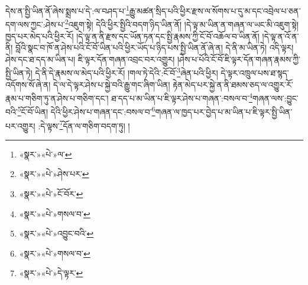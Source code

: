 དེས་ན་སྤྱི་ཡིན་ནོ་ཞེས་སྨྲས་པ་དེ་:ལ་བཤད་པ་\footnote{«སྣར་»«པེ་»ལ་}རྒྱུ་མཚན་སྲིད་པའི་ཕྱིར་རྫས་ལ་སོགས་པ་དུ་མ་དང་འབྲེལ་པ་ཅན་དག་ལས་ཀྱང་:ཤེས་པ་\footnote{«སྣར་»«པེ་»ཤེས་པར་}འཇུག་སྟེ། དེའི་ཕྱིར་སྤྱིའི་བདག་ཉིད་ཡིན་ནོ། །དེ་ལྟ་མ་ཡིན་ན་གཞན་ལ་ཡང་མི་འཇུག་སྟེ། ཁྱད་པར་མེད་པའི་ཕྱིར་རོ། །དེ་ལྟ་ན་ནི་རྫས་དང་ཡོན་ཏན་དང་སྤྱི་རྣམས་ཀྱི་ངོ་བོ་འཆོལ་བ་ཡིན་ནོ། །དེ་ལྟ་ན་འོ་ན་ནི། བློའི་སྣང་བ་ཁོ་ན་ཤེས་པའི་ངོ་བོ་ཡིན་པའི་ཕྱིར་ཡོད་པ་ཉིད་པས་སྤྱི་ཡིན་ནོ་ཞེ་ན། དེ་ནི་མ་ཡིན་ཏེ། འདི་ལྟར། ཤེས་དང་ཐ་དད་མ་ཡིན་པ། ཇི་ལྟར་དོན་གཞན་འབྲང་བར་འགྱུར། །ཤེས་པ་པོའི་ངོ་བོ་ཇི་ལྟར་དོན་གཞན་རྣམས་ཀྱི་སྤྱི་ཡིན་ཏེ། དེ་ནི་དེ་རྣམས་ལ་མེད་པའི་ཕྱིར་རོ། །གལ་ཏེ་དེའི་:ངོ་བོ་\footnote{«སྣར་»«པེ་»ངོ་བོར་}ཞེན་པའི་ཕྱིར། དེ་ལྟར་འཁྲུལ་པས་ཐ་སྙད་འདོགས་སོ་ཞེ་ན། དེ་ལ་དེ་ལྟར་ཤེས་པ་སྐྱེ་བའི་རྒྱུ་གང་ཞིག་ཡིན། རྟེན་མེད་པར་སྐྱེ་ན་ནི་ཐམས་ཅད་ལ་འགྱུར་རོ་རྣམ་པ་གཅིག་ཏུ་ན་ཤེས་པ་གཅིག་དང་། ཐ་དད་པ་མ་ཡིན་པ་ཇི་ལྟར་ཤེས་པ་གཞན་:བསལ་བ་\footnote{«སྣར་»«པེ་»གསལ་བ་}གཞན་ལས་:བྱུང་བའི་\footnote{«སྣར་»«པེ་»འབྱུང་བའི་}ངོ་བོ་ཡིན། དེའི་ཕྱིར་ཤེས་པ་གཞན་དང་:བསལ་བ་\footnote{«སྣར་»«པེ་»གསལ་བ་}གཞན་ལ་ཁྱད་པར་བྱེད་པ་མ་ཡིན་པ་ཇི་ལྟར་སྤྱི་ཡིན་པར་འགྱུར། :དེ་ལྟས་\footnote{«སྣར་»«པེ་»དེ་ལྟར་}དོན་ལ་གཅིག་བདག་ཏུ། །
